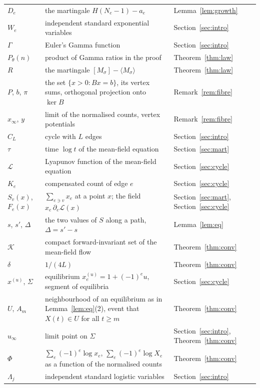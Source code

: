 \documentclass[11pt]{amsart}
\theoremstyle{remark}\newtheorem{remark}[theorem]{Remark}
\begin{document}
\begin{center}
\begin{tabular}{l p{5.6cm} p{2.5cm}}
$D_e$ & the martingale $H(N_e-1)-a_e$ & Lemma~\ref{lem:growth}\\
$W_e$ & independent standard exponential variables & Section~\ref{sec:intro}\\
$\Gamma$ & Euler's Gamma function & Section~\ref{sec:intro}\\
$P_\theta(n)$ & product of Gamma ratios in the proof & Theorem~\ref{thm:law}\\
$R$ & the martingale $[M_\sigma]-\langle M_\sigma\rangle$ & Theorem~\ref{thm:law}\\
$P$, $b$, $\pi$ & the set $\{x>0:Bx=b\}$, its vertex sums, orthogonal projection onto $\ker B$ & Remark~\ref{rem:fibre}\\
$x_\infty$, $y$ & limit of the normalised counts, vertex potentials & Remark~\ref{rem:fibre}\\
$C_L$ & cycle with $L$ edges & Section~\ref{sec:intro}\\
$\tau$ & time $\log t$ of the mean-field equation & Section~\ref{sec:mart}\\
$\mathcal{L}$ & Lyapunov function of the mean-field equation & Section~\ref{sec:cycle}\\
$K_e$ & compensated count of edge $e$ & Section~\ref{sec:cycle}\\
$S_v(x)$, $F_e(x)$ & $\sum_{e\ni v}x_e$ at a point $x$; the field $x_e\,\partial_e\mathcal{L}(x)$ & Section~\ref{sec:mart}, Section~\ref{sec:cycle}\\
$s$, $s'$, $\Delta$ & the two values of $S$ along a path, $\Delta=s'-s$ & Lemma~\ref{lem:eq}\\
$\mathcal{K}$ & compact forward-invariant set of the mean-field flow & Theorem~\ref{thm:conv}\\
$\delta$ & $1/(4L)$ & Theorem~\ref{thm:conv}\\
$x^{(u)}$, $\Sigma$ & equilibrium $x^{(u)}_e=1+(-1)^eu$, segment of equilibria & Section~\ref{sec:cycle}\\
$U$, $A_m$ & neighbourhood of an equilibrium as in Lemma~\ref{lem:eq}(2), event that $X(t)\in U$ for all $t\ge m$ & Theorem~\ref{thm:conv}\\
$u_\infty$ & limit point on $\Sigma$ & Section~\ref{sec:intro}, Theorem~\ref{thm:conv}\\
$\Phi$ & $\sum_e(-1)^e\log x_e$, $\sum_e(-1)^e\log X_e$ as a function of the normalised counts & Theorem~\ref{thm:conv}\\
$\Lambda_j$ & independent standard logistic variables & Section~\ref{sec:intro}\\
\bottomrule
\end{tabular}


\end{center}
\end{document}
